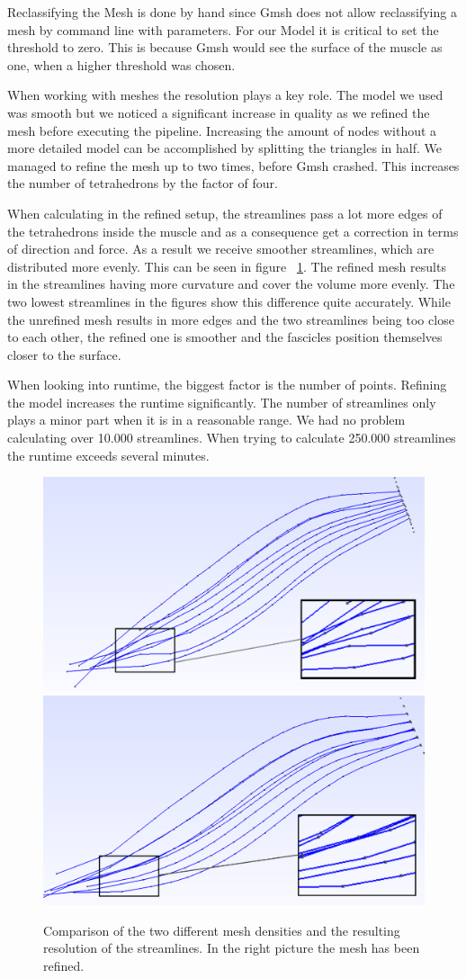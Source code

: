\documentclass[preprint,journal]{vgtc}       %
\begin{document}
Reclassifying the Mesh is done by hand since Gmsh does not allow reclassifying a mesh by command line with parameters. 
For our Model it is critical to set the threshold to zero. 
This is because Gmsh would see the surface of the muscle as one, when a higher threshold was chosen.

When working with meshes the resolution plays a key role. 
The model we used was smooth but we noticed a significant increase in quality as we refined the mesh before executing the pipeline. 
Increasing the amount of nodes without a more detailed model can be accomplished by splitting the triangles in half.
We managed to refine the mesh up to two times, before Gmsh crashed.
This increases the number of tetrahedrons by the factor of four. 

When calculating in the refined setup, the streamlines pass a lot more edges of the tetrahedrons inside the muscle and as a consequence get a correction in terms of direction and force. 
As a result we receive smoother streamlines, which are distributed more evenly. 
This can be seen in figure ~\ref{fig:refStreamlines}.
The refined mesh results in the streamlines having more curvature and cover the volume more evenly.
The two lowest streamlines in the figures show this difference quite accurately.
While the unrefined mesh results in more edges and the two streamlines being too close to each other, the refined one is smoother and the fascicles position themselves closer to the surface.

When looking into runtime, the biggest factor is the number of points.
Refining the model increases the runtime significantly. 
The number of streamlines only plays a minor part when it is in a reasonable range.
We had no problem calculating over 10.000 streamlines. When trying to calculate 250.000 streamlines the runtime exceeds several minutes.

\begin{figure}
	\begin{minipage}{\linewidth}
		\includegraphics[width=.5\linewidth]{Streamlines_zoom.PNG}
		\includegraphics[width=.51\linewidth]{refStreamlines_zoom.PNG}
		\caption{Comparison of the two different mesh densities and the resulting resolution of the streamlines. In the right picture the mesh has been refined.}
		\label{fig:refStreamlines}
	\end{minipage}
\end{figure}
\end{document}
